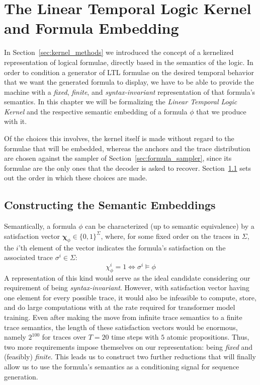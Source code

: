 \documentclass[titlepage,a4paper,11pt]{report}
\newenvironment{RSnewblock}{\par\color{blue!65!black}}{\par}
\begin{document}
\chapter{The Linear Temporal Logic Kernel and Formula Embedding} \label{chap:kernel}
    In Section~\ref{sec:kernel_methods} we introduced the concept of a kernelized representation of logical formulae, directly based in the semantics of the logic. In order to condition a  generator of LTL formulae on the desired temporal behavior that we want the generated formula to display, we have to be able to provide the machine with a \emph{fixed}, \emph{finite}, and \emph{syntax-invariant} representation of that formula's semantics. In this chapter we will be formalizing the \textit{Linear Temporal Logic Kernel} and the respective semantic embedding of a formula $\phi$ that we produce with it.

    \begin{RSnewblock}
    Of the choices this involves, the kernel itself is made without regard to the formulae that will be embedded, whereas the anchors and the trace distribution are chosen against the sampler of Section~\ref{sec:formula_sampler}, since its formulae are the only ones that the decoder is asked to recover. Section~\ref{sec:constructing_embeddings} sets out the order in which these choices are made.
    \end{RSnewblock}

    \section{Constructing the Semantic Embeddings}\label{sec:constructing_embeddings}
    Semantically, a formula $\phi$ can be characterized (up to semantic equivalence) by a satisfaction vector $\bm\chi_\phi \in \{0,1\}^\Sigma$, where, for some fixed order on the traces in $\Sigma$, the $i$'th element of the vector indicates the formula's satisfaction on the associated trace $\sigma^i \in \Sigma$:
    \begin{equation}
        \chi_\phi^i = 1 \iff \sigma^i \vDash \phi
    \end{equation}
    A representation of this kind would serve as the ideal candidate considering our requirement of being \emph{syntax-invariant}. However, with satisfaction vector having one element for every possible trace, it would also be infeasible to compute, store, and do large computations with at the rate required for transformer model training. Even after making the move from infinite trace semantics to a finite trace semantics, the length of these satisfaction vectors would be enormous, namely $2^{100}$ for traces over $T=20$ time steps with $5$ atomic propositions. Thus, two more requirements impose themselves on our representation: being \emph{fixed} and (feasibly) \emph{finite}. This leads us to construct two further reductions that will finally allow us to use the formula's semantics as a conditioning signal for sequence generation.
\end{document}

